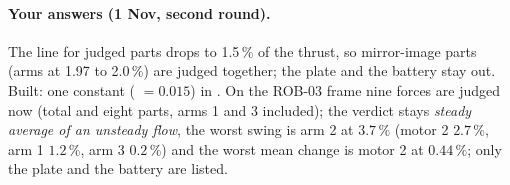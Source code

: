 \paragraph{Your answers (1 Nov, second round).} The line for judged parts drops to 1.5\,\% of the thrust, so mirror-image parts
(arms at 1.97 to 2.0\,\%) are judged together; the plate and the battery stay out. Built: one constant ( $=0.015$) in . On the ROB-03 frame nine forces are judged now (total and eight parts, arms 1 and 3 included); the verdict stays \emph{steady average of an unsteady flow}, the worst swing is arm 2 at $3.7\,\%$ (motor 2 $2.7\,\%$, arm 1 $1.2\,\%$, arm 3 $0.2\,\%$) and the worst mean change is motor 2 at $0.44\,\%$; only the plate and the battery are listed.
